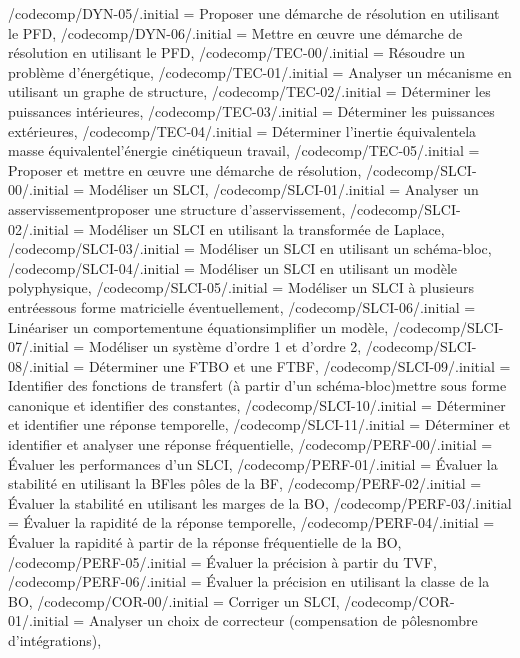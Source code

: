{    /codecomp/DYN-05/.initial = Proposer une démarche de résolution en utilisant le PFD,
    /codecomp/DYN-06/.initial = Mettre en œuvre une démarche de résolution en utilisant le PFD,
    /codecomp/TEC-00/.initial = Résoudre un problème d'énergétique,
    /codecomp/TEC-01/.initial = Analyser un mécanisme en utilisant un graphe de structure,
    /codecomp/TEC-02/.initial = Déterminer les puissances intérieures,
    /codecomp/TEC-03/.initial = Déterminer les puissances extérieures,
    /codecomp/TEC-04/.initial = Déterminer l'inertie équivalente\CommaXp la masse équivalente\CommaXp l'énergie cinétique\CommaXp un travail,
    /codecomp/TEC-05/.initial = Proposer et mettre en œuvre une démarche de résolution,
    /codecomp/SLCI-00/.initial = Modéliser un SLCI,
    /codecomp/SLCI-01/.initial = Analyser un asservissement\CommaXp proposer une structure d'asservissement,
    /codecomp/SLCI-02/.initial = Modéliser un SLCI en utilisant la transformée de Laplace,
    /codecomp/SLCI-03/.initial = Modéliser un SLCI en utilisant un schéma-bloc,
    /codecomp/SLCI-04/.initial = Modéliser un SLCI en utilisant un modèle polyphysique,
	/codecomp/SLCI-05/.initial = Modéliser un SLCI à plusieurs entrées\CommaXp sous forme matricielle éventuellement,
    /codecomp/SLCI-06/.initial = Linéariser un comportement\CommaXp une équation\CommaXp simplifier un modèle,
    /codecomp/SLCI-07/.initial = Modéliser un système d'ordre 1 et d'ordre 2,
    /codecomp/SLCI-08/.initial = Déterminer une FTBO et une FTBF,
    /codecomp/SLCI-09/.initial = Identifier des fonctions de transfert (à partir d'un schéma-bloc)\CommaXp mettre sous forme canonique et identifier des constantes,
    /codecomp/SLCI-10/.initial = Déterminer et identifier une réponse temporelle,
    /codecomp/SLCI-11/.initial = Déterminer et identifier et analyser une réponse fréquentielle,
    /codecomp/PERF-00/.initial = Évaluer les performances d'un SLCI,
    /codecomp/PERF-01/.initial = Évaluer la stabilité en utilisant la BF\CommaXp les pôles de la BF,
    /codecomp/PERF-02/.initial = Évaluer la stabilité en utilisant les marges de la BO,
    /codecomp/PERF-03/.initial = Évaluer la rapidité de la réponse temporelle,
    /codecomp/PERF-04/.initial = Évaluer la rapidité à partir de la réponse fréquentielle de la BO,
    /codecomp/PERF-05/.initial = Évaluer la précision à partir du TVF,
    /codecomp/PERF-06/.initial = Évaluer la précision en utilisant la classe de la BO,
    /codecomp/COR-00/.initial = Corriger un SLCI,
    /codecomp/COR-01/.initial = Analyser un choix de correcteur (compensation de pôles\CommaXp nombre d'intégrations),
}

